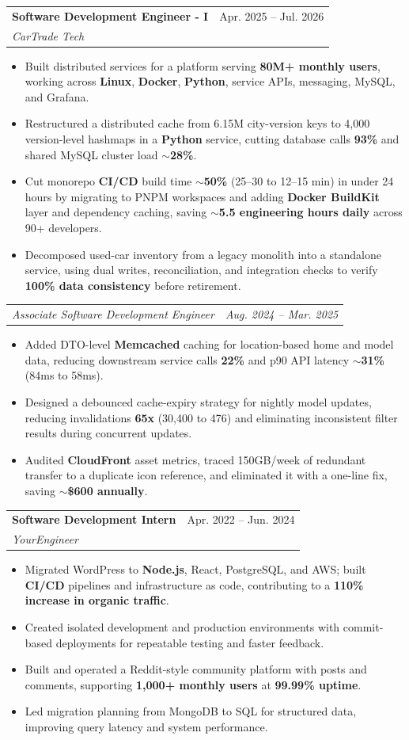\documentclass[letterpaper,11pt]{article}
\makeatletter
\newcommand{\resumeItem}[1]{
  \item\small{
    {#1 \vspace{-2pt}}
  }
}
\newcommand{\resumeSubheading}[4]{
  \vspace{-2pt}\item
    \begin{tabular*}{0.97\textwidth}[t]{l@{\extracolsep{\fill}}r}
      \textbf{#1} & #2 \\
      \textit{\small#3} & \textit{\small #4} \\
    \end{tabular*}\vspace{-7pt}
}
\newcommand{\resumeSubSubheading}[2]{
    \item
    \begin{tabular*}{0.97\textwidth}{l@{\extracolsep{\fill}}r}
      \textit{\small#1} & \textit{\small #2} \\
    \end{tabular*}\vspace{-7pt}
}
\newcommand{\resumeItemListStart}{\begin{itemize}}
\newcommand{\resumeItemListEnd}{\end{itemize}\vspace{-5pt}}
\makeatother
\begin{document}
\resumeSubheading
{Software Development Engineer - I}{Apr. 2025 -- Jul. 2026}
{CarTrade Tech}{ }
\resumeItemListStart
\resumeItem{Built distributed services for a platform serving \textbf{80M+ monthly users}, working across \textbf{Linux}, \textbf{Docker}, \textbf{Python}, service APIs, messaging, MySQL, and Grafana.}
\resumeItem{Restructured a distributed cache from 6.15M city-version keys to 4,000 version-level hashmaps in a \textbf{Python} service, cutting database calls \textbf{93\%} and shared MySQL cluster load \textbf{$\sim$28\%}.}
\resumeItem{Cut monorepo \textbf{CI/CD} build time \textbf{$\sim$50\%} (25--30 to 12--15 min) in under 24 hours by migrating to PNPM workspaces and adding \textbf{Docker BuildKit} layer and dependency caching, saving \textbf{$\sim$5.5 engineering hours daily} across 90+ developers.}
\resumeItem{Decomposed used-car inventory from a legacy monolith into a standalone service, using dual writes, reconciliation, and integration checks to verify \textbf{100\% data consistency} before retirement.}
\resumeItemListEnd
\resumeSubSubheading
{Associate Software Development Engineer}{Aug. 2024 -- Mar. 2025}
\resumeItemListStart
\resumeItem{Added DTO-level \textbf{Memcached} caching for location-based home and model data, reducing downstream service calls \textbf{22\%} and p90 API latency \textbf{$\sim$31\%} (84ms to 58ms).}
\resumeItem{Designed a debounced cache-expiry strategy for nightly model updates, reducing invalidations \textbf{65x} (30,400 to 476) and eliminating inconsistent filter results during concurrent updates.}
\resumeItem{Audited \textbf{CloudFront} asset metrics, traced 150GB/week of redundant transfer to a duplicate icon reference, and eliminated it with a one-line fix, saving \textbf{$\sim$\$600 annually}.}
\resumeItemListEnd

\resumeSubheading
{Software Development Intern}{Apr. 2022 -- Jun. 2024}
{YourEngineer}{ }
\resumeItemListStart
\resumeItem{Migrated WordPress to \textbf{Node.js}, React, PostgreSQL, and AWS; built \textbf{CI/CD} pipelines and infrastructure as code, contributing to a \textbf{110\% increase in organic traffic}.}
\resumeItem{Created isolated development and production environments with commit-based deployments for repeatable testing and faster feedback.}
\resumeItem{Built and operated a Reddit-style community platform with posts and comments, supporting \textbf{1,000+ monthly users} at \textbf{99.99\% uptime}.}
\resumeItem{Led migration planning from MongoDB to SQL for structured data, improving query latency and system performance.}
\resumeItemListEnd
\end{document}
